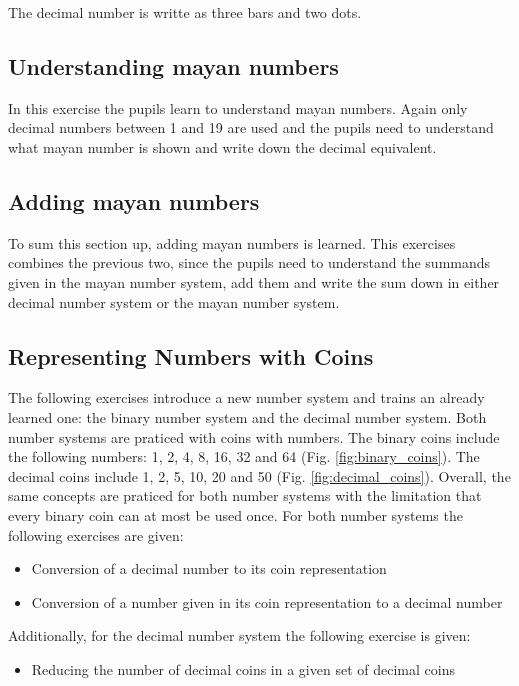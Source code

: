 \begin{example}
    The decimal number  is writte as three bars and two dots.
\end{example}

\subsection*{Understanding mayan numbers}

In this exercise the pupils learn to understand mayan numbers. Again only decimal numbers between 1 and 19 are used and the pupils need to understand what mayan number is shown and write down the decimal equivalent.

\subsection*{Adding mayan numbers}

To sum this section up, adding mayan numbers is learned. This exercises combines the previous two, since the pupils need to understand the summands given in the mayan number system, add them and write the sum down in either decimal number system or the mayan number system.

\subsection{Representing Numbers with Coins}

The following exercises introduce a new number system and trains an already learned one: the binary number system and the decimal number system. Both number systems are praticed with coins with numbers. The binary coins include the following numbers: 1, 2, 4, 8, 16, 32 and 64 (Fig. \ref{fig:binary_coins}). The decimal coins include 1, 2, 5, 10, 20 and 50 (Fig. \ref{fig:decimal_coins}). 
Overall, the same concepts are praticed for both number systems with the limitation that every binary coin can at most be used once. For both number systems the following exercises are given:
\begin{itemize}
    \item Conversion of a decimal number to its coin representation
    \item Conversion of a number given in its coin representation to a decimal number
\end{itemize}
Additionally, for the decimal number system the following exercise is given:
\begin{itemize}
    \item Reducing the number of decimal coins in a given set of decimal coins
\end{itemize}


